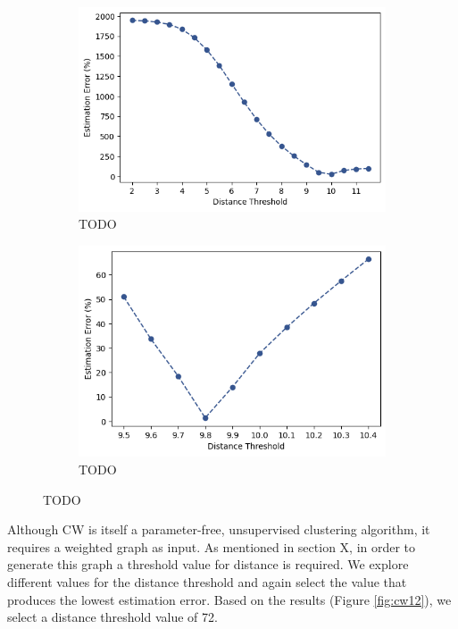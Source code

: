 \documentclass[a4paper,12pt]{report}
\begin{document}
\begin{figure}[ht]
\begin{subfigure}{.5\textwidth}
  \centering
  \includegraphics[width=.9\linewidth]{images/face/dbscan-parameter-estimation-1.png}  
  \caption{TODO}
  \label{fig:db-sub-first}
\end{subfigure}
\begin{subfigure}{.5\textwidth}
  \centering
  \includegraphics[width=.9\linewidth]{images/face/dbscan-parameter-estimation-2.png}  
  \caption{TODO}
  \label{fig:db-sub-second}
\end{subfigure}
\caption{TODO}
\label{fig:db12}
\end{figure}

Although CW is itself a parameter-free, unsupervised clustering algorithm, it requires a weighted graph as input. As mentioned in section X, in order to generate this graph a threshold value for distance is required. We explore different values for the distance threshold and again select the value that produces the lowest estimation error. Based on the results (Figure \ref{fig:cw12}), we select a distance threshold value of 72.
\end{document}
